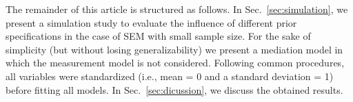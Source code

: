 \documentclass[graybox]{svmult}
\begin{document}



The remainder of this article is structured as follows. In Sec.~\ref{sec:simulation}, we present a simulation study to evaluate the influence of different prior specifications in the case of SEM with small sample size. For the sake of simplicity (but without losing generalizability) we present a mediation model in which the measurement model is not considered. Following common procedures, all variables were standardized (i.e., mean = 0 and a standard deviation = 1) before fitting all models. In Sec.~\ref{sec:dicussion}, we discuss the obtained results.



%
\end{document}
